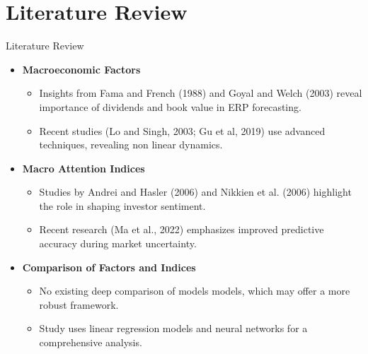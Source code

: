 \documentclass{beamer}
\begin{document}
\section{Literature Review}
\begin{frame}{Literature Review}
  \begin{itemize}
    \item \textbf{Macroeconomic Factors}
      \begin{itemize}
        \item Insights from Fama and French (1988) and Goyal and Welch (2003) reveal importance of dividends and book value in ERP forecasting.
        \item Recent studies (Lo and Singh, 2003; Gu et al, 2019) use advanced techniques, revealing non linear dynamics.
      \end{itemize}
    \item \textbf{Macro Attention Indices}
      \begin{itemize}
        \item Studies by Andrei and Hasler (2006) and Nikkien et al. (2006) highlight the role in shaping investor sentiment.
        \item Recent research (Ma et al., 2022) emphasizes improved predictive accuracy during market uncertainty.
      \end{itemize}
    \item \textbf{Comparison of Factors and Indices}
      \begin{itemize}
        \item No existing deep comparison of models models, which may offer a more robust framework.
        \item Study uses linear regression models and neural networks for a comprehensive analysis.
      \end{itemize}
  \end{itemize}
\end{frame}
\end{document}
